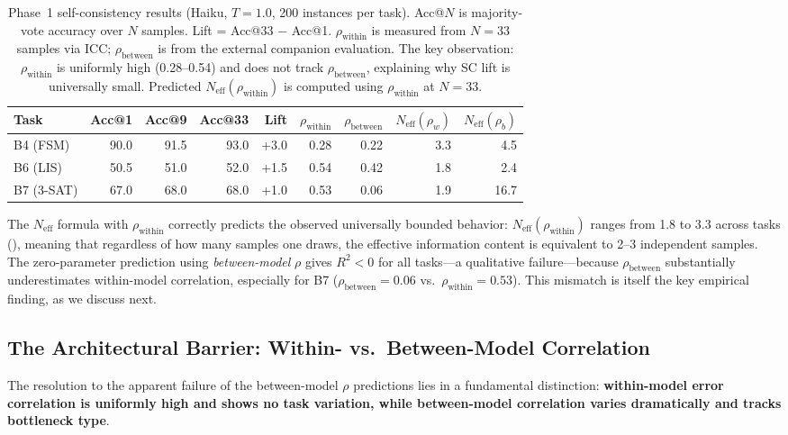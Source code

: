 \documentclass{article}
\theoremstyle{definition}
\theoremstyle{remark}
\begin{document}
\begin{table}[t]
\centering
\caption{Phase~1 self-consistency results (Haiku, $T = 1.0$, 200 instances per task). Acc@$N$ is majority-vote accuracy over $N$ samples. Lift = Acc@33 $-$ Acc@1. $\rho_{\text{within}}$ is measured from $N = 33$ samples via ICC; $\rho_{\text{between}}$ is from the external companion evaluation. The key observation: $\rho_{\text{within}}$ is uniformly high (0.28--0.54) and does not track $\rho_{\text{between}}$, explaining why SC lift is universally small. Predicted $N_{\text{eff}}(\rho_{\text{within}})$ is computed using $\rho_{\text{within}}$ at $N = 33$.}
\label{tab:results}
\small
\setlength{\tabcolsep}{3pt}
\begin{tabular}{@{}l rrr r rr rr@{}}
\toprule
\textbf{Task} & \textbf{Acc@1} & \textbf{Acc@9} & \textbf{Acc@33} & \textbf{Lift} & $\rho_{\text{within}}$ & $\rho_{\text{between}}$ & $N_{\text{eff}}(\rho_w)$ & $N_{\text{eff}}(\rho_b)$ \\
\midrule
B4 (FSM)   & 90.0 & 91.5 & 93.0 & +3.0 & 0.28 & 0.22 & 3.3 & 4.5 \\
B6 (LIS)   & 50.5 & 51.0 & 52.0 & +1.5 & 0.54 & 0.42 & 1.8 & 2.4 \\
B7 (3-SAT) & 67.0 & 68.0 & 68.0 & +1.0 & 0.53 & 0.06 & 1.9 & 16.7 \\
\bottomrule
\end{tabular}
\end{table}

The $N_{\text{eff}}$ formula with $\rho_{\text{within}}$ correctly predicts the observed universally bounded behavior: $N_{\text{eff}}(\rho_{\text{within}})$ ranges from 1.8 to 3.3 across tasks (), meaning that regardless of how many samples one draws, the effective information content is equivalent to 2--3 independent samples.
The zero-parameter prediction using \emph{between-model} $\rho$ gives $R^2 < 0$ for all tasks---a qualitative failure---because $\rho_{\text{between}}$ substantially underestimates within-model correlation, especially for B7 ($\rho_{\text{between}} = 0.06$ vs.\ $\rho_{\text{within}} = 0.53$).
This mismatch is itself the key empirical finding, as we discuss next.

\subsection{The Architectural Barrier: Within- vs.\ Between-Model Correlation}
\label{sec:exp_correlation}

The resolution to the apparent failure of the between-model $\rho$ predictions lies in a fundamental distinction: \textbf{within-model error correlation is uniformly high and shows no task variation, while between-model correlation varies dramatically and tracks bottleneck type}.
\end{document}
